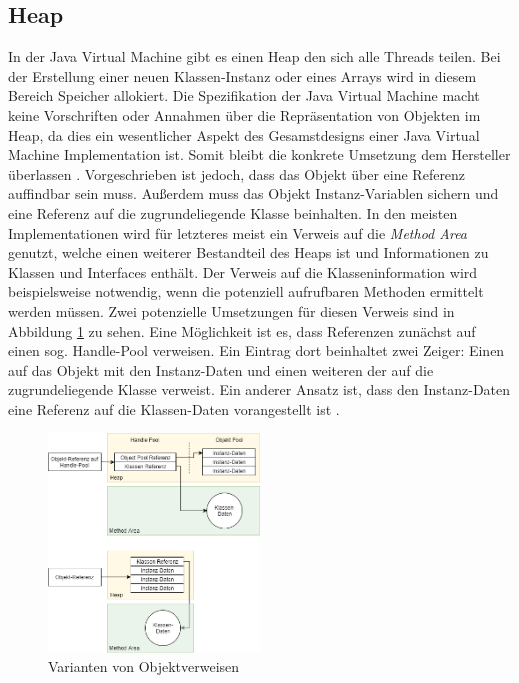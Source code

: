 \documentclass[conference]{IEEEtran}
\begin{document}
\subsection{Heap}
\label{chHeap}
In der Java Virtual Machine gibt es einen Heap den sich alle Threads teilen. Bei der Erstellung einer neuen Klassen-Instanz oder eines Arrays wird in diesem Bereich Speicher allokiert. Die Spezifikation der Java Virtual Machine macht keine Vorschriften oder Annahmen über die Repräsentation von Objekten im Heap, da dies ein wesentlicher Aspekt des Gesamstdesigns einer Java Virtual Machine Implementation ist. Somit bleibt die konkrete Umsetzung dem Hersteller überlassen \cite{Lindholm.21.08.2018}. Vorgeschrieben ist jedoch, dass das Objekt über eine Referenz auffindbar sein muss. Außerdem muss das Objekt Instanz-Variablen sichern und eine Referenz auf die zugrundeliegende Klasse beinhalten. In den meisten Implementationen wird für letzteres meist ein Verweis auf die \textit{Method Area} genutzt, welche einen weiterer Bestandteil des Heaps ist und Informationen zu Klassen und Interfaces enthält. Der Verweis auf die Klasseninformation wird beispielsweise notwendig, wenn die potenziell aufrufbaren Methoden ermittelt werden müssen. Zwei potenzielle Umsetzungen für diesen Verweis sind in Abbildung \ref{fig:objektverweise} zu sehen. Eine Möglichkeit ist es, dass Referenzen zunächst auf einen sog. Handle-Pool verweisen. Ein Eintrag dort beinhaltet zwei Zeiger: Einen auf das Objekt mit den Instanz-Daten und einen weiteren der auf die zugrundeliegende Klasse verweist. Ein anderer Ansatz ist, dass den Instanz-Daten eine Referenz auf die Klassen-Daten vorangestellt ist \cite{Venners.1999}.
\begin{figure}[htbp] 
  \centering
     \includegraphics[width=0.5\textwidth]{Grafiken/ObjektReferenzKlasse.png}
  \caption{Varianten von Objektverweisen}
  \label{fig:objektverweise}
\end{figure}
\end{document}
